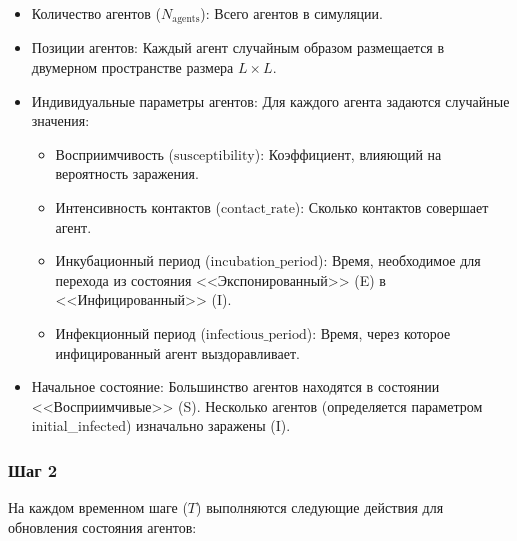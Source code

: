\documentclass[a4paper, 14pt]{extreport}
\numberwithin{equation}{section}
\begin{document}
	\begin{itemize}
		\item {Количество агентов ($N_{\text{agents}}$)}: Всего агентов в симуляции.
		\item {Позиции агентов}: Каждый агент случайным образом размещается в двумерном пространстве размера $L \times L$.
		\item {Индивидуальные параметры агентов}: Для каждого агента задаются случайные значения:
		\begin{itemize}
			\item {Восприимчивость ($\text{susceptibility}$)}: Коэффициент, влияющий на вероятность заражения.
			\item {Интенсивность контактов ($\text{contact\_rate}$)}: Сколько контактов совершает агент.
			\item {Инкубационный период ($\text{incubation\_period}$)}: Время, необходимое для перехода из состояния <<Экспонированный>> (E) в <<Инфицированный>> (I).
			\item {Инфекционный период ($\text{infectious\_period}$)}: Время, через которое инфицированный агент выздоравливает.
		\end{itemize}
		\item {Начальное состояние}: Большинство агентов находятся в состоянии <<Восприимчивые>> (S). Несколько агентов (определяется параметром\\ initial\_infected) изначально заражены (I).
	\end{itemize}
	
	\subsubsection*{Шаг 2}
	
	На каждом временном шаге ($T$) выполняются следующие действия для обновления состояния агентов:
	
\end{document}
